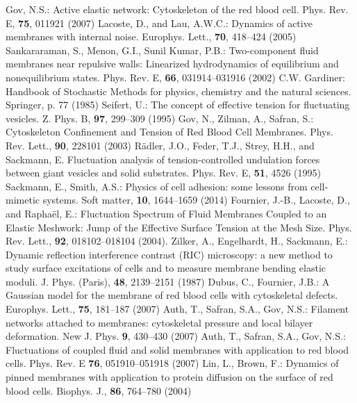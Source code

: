 \documentclass[graybox]{svmult}
\begin{document}
\begin{thebibliography}{99.}
Gov, N.S.: Active elastic network: Cytoskeleton of the red blood cell. Phys. Rev. E, \textbf{75}, 011921 (2007)
%
Lacoste, D., and Lau, A.W.C.: Dynamics of active membranes with internal noise. Europhys. Lett., \textbf{70}, 418--424 (2005)
%
Sankararaman, S., Menon, G.I., Sunil Kumar, P.B.: Two-component fluid membranes near repulsive walls: Linearized hydrodynamics of equilibrium and nonequilibrium states. Phys. Rev. E, \textbf{66}, 031914--031916 (2002)
%
C.W. Gardiner: Handbook of Stochastic Methods for physics, chemistry and the natural sciences. Springer, p. 77 (1985)
%
Seifert, U.: The concept of effective tension for fluctuating vesicles. Z. Phys. B, \textbf{97}, 299--309 (1995)
%
Gov, N., Zilman, A., Safran, S.: Cytoskeleton Confinement and Tension of Red Blood Cell Membranes. Phys. Rev. Lett., \textbf{90}, 228101 (2003)
%
R\"{a}dler, J.O., Feder, T.J., Strey, H.H., and Sackmann, E. Fluctuation analysis of tension-controlled undulation forces between giant vesicles and solid substrates. Phys. Rev. E, \textbf{51}, 4526 (1995)
%
Sackmann, E., Smith, A.S.: Physics of cell adhesion: some lessons from cell-mimetic systems. Soft matter, \textbf{10}, 1644--1659 (2014)
%
Fournier, J.-B., Lacoste, D., and Rapha\"{e}l, E.: Fluctuation Spectrum of Fluid Membranes Coupled to an Elastic Meshwork: Jump of the Effective Surface Tension at the Mesh Size. Phys. Rev. Lett., \textbf{92}, 018102--018104 (2004).
%
Zilker, A., Engelhardt, H., Sackmann, E.: Dynamic reflection interference contrast (RIC) microscopy: a new method to study surface excitations of cells and to measure membrane bending elastic moduli. J. Phys. (Paris), \textbf{48}, 2139--2151 (1987)
%
Dubus, C., Fournier, J.B.: A Gaussian model for the membrane of red blood cells with cytoskeletal defects. Europhys. Lett., \textbf{75}, 181--187  (2007)
%
Auth, T., Safran, S.A., Gov, N.S.: Filament networks attached to membranes: cytoskeletal pressure and local bilayer deformation. New J. Phys. \textbf{9}, 430--430 (2007)
%
Auth, T., Safran, S.A., Gov, N.S.: Fluctuations of coupled fluid and solid membranes with application to red blood cells. Phys. Rev. E \textbf{76}, 051910--051918 (2007)
%
Lin, L., Brown, F.: Dynamics of pinned membranes with application to protein diffusion on the surface of red blood cells. Biophys. J., \textbf{86}, 764--780 (2004)

\end{thebibliography}
\end{document}
